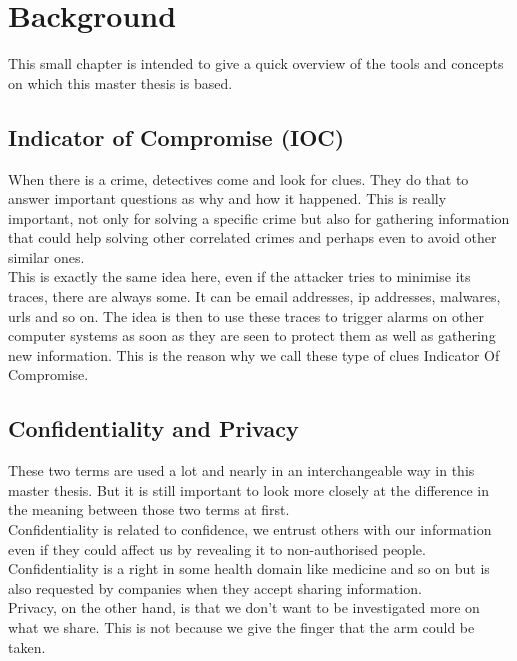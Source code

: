 \documentclass{eplmastersthesis}
\begin{document}
\chapter{Background}
This small chapter is intended to give a quick overview of the tools and concepts on which this master thesis is based.

\section{Indicator of Compromise (IOC)}
When there is a crime, detectives come and look for clues. They do that to answer important questions as why and how it happened. This is really important, not only for solving a specific crime but also for gathering information that could help solving other correlated crimes and perhaps even to avoid other similar ones.\\

This is exactly the same idea here, even if the attacker tries to minimise its traces, there are always some. It can be email addresses, \gls{ip} addresses, malwares, \glspl{url} and so on.
The idea is then to use these traces to trigger alarms on other computer systems as soon as they are seen to protect them as well as gathering new information. This is the reason why we call these type of clues Indicator Of Compromise.

\section{Confidentiality and Privacy}
These two terms are used a lot and nearly in an interchangeable way in this master thesis. But it is still important to look more closely at the difference in the meaning between those two terms at first.\\

Confidentiality is related to confidence, we entrust others with our information even if they could affect us by revealing it to non-authorised people. Confidentiality is a right in some health domain like medicine and so on but is also requested by companies when they accept sharing information.\\

Privacy, on the other hand, is that we don't want to be investigated more on what we share. This is not because we give the finger that the arm could be taken.
\end{document}
